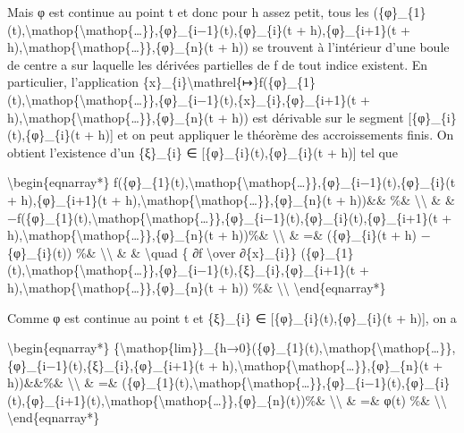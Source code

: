 \documentclass[]{article}
\begin{document}
Mais φ est continue au point t et donc pour h assez petit, tous les
(\{φ\}\_\{1\}(t),\textbackslash{}mathop\{\textbackslash{}mathop\{\ldots{}\}\},\{φ\}\_\{i−1\}(t),\{φ\}\_\{i\}(t
+ h),\{φ\}\_\{i+1\}(t +
h),\textbackslash{}mathop\{\textbackslash{}mathop\{\ldots{}\}\},\{φ\}\_\{n\}(t
+ h)) se trouvent à l'intérieur d'une boule de centre a sur laquelle les
dérivées partielles de f de tout indice existent. En particulier,
l'application
\{x\}\_\{i\}\textbackslash{}mathrel\{↦\}f(\{φ\}\_\{1\}(t),\textbackslash{}mathop\{\textbackslash{}mathop\{\ldots{}\}\},\{φ\}\_\{i−1\}(t),\{x\}\_\{i\},\{φ\}\_\{i+1\}(t
+
h),\textbackslash{}mathop\{\textbackslash{}mathop\{\ldots{}\}\},\{φ\}\_\{n\}(t
+ h)) est dérivable sur le segment {[}\{φ\}\_\{i\}(t),\{φ\}\_\{i\}(t +
h){]} et on peut appliquer le théorème des accroissements finis. On
obtient l'existence d'un \{ξ\}\_\{i\} ∈
{[}\{φ\}\_\{i\}(t),\{φ\}\_\{i\}(t + h){]} tel que

\textbackslash{}begin\{eqnarray*\}
f(\{φ\}\_\{1\}(t),\textbackslash{}mathop\{\textbackslash{}mathop\{\ldots{}\}\},\{φ\}\_\{i−1\}(t),\{φ\}\_\{i\}(t
+ h),\{φ\}\_\{i+1\}(t +
h),\textbackslash{}mathop\{\textbackslash{}mathop\{\ldots{}\}\},\{φ\}\_\{n\}(t
+ h))\&\& \%\& \textbackslash{}\textbackslash{} \& \&
−f(\{φ\}\_\{1\}(t),\textbackslash{}mathop\{\textbackslash{}mathop\{\ldots{}\}\},\{φ\}\_\{i−1\}(t),\{φ\}\_\{i\}(t),\{φ\}\_\{i+1\}(t
+
h),\textbackslash{}mathop\{\textbackslash{}mathop\{\ldots{}\}\},\{φ\}\_\{n\}(t
+ h))\%\& \textbackslash{}\textbackslash{} \& =\& (\{φ\}\_\{i\}(t + h) −
\{φ\}\_\{i\}(t)) \%\& \textbackslash{}\textbackslash{} \& \&
\textbackslash{}quad \{ ∂f \textbackslash{}over ∂\{x\}\_\{i\}\}
(\{φ\}\_\{1\}(t),\textbackslash{}mathop\{\textbackslash{}mathop\{\ldots{}\}\},\{φ\}\_\{i−1\}(t),\{ξ\}\_\{i\},\{φ\}\_\{i+1\}(t
+
h),\textbackslash{}mathop\{\textbackslash{}mathop\{\ldots{}\}\},\{φ\}\_\{n\}(t
+ h)) \%\& \textbackslash{}\textbackslash{}
\textbackslash{}end\{eqnarray*\}

Comme φ est continue au point t et \{ξ\}\_\{i\} ∈
{[}\{φ\}\_\{i\}(t),\{φ\}\_\{i\}(t + h){]}, on a

\textbackslash{}begin\{eqnarray*\}
\{\textbackslash{}mathop\{lim\}\}\_\{h→0\}(\{φ\}\_\{1\}(t),\textbackslash{}mathop\{\textbackslash{}mathop\{\ldots{}\}\},\{φ\}\_\{i−1\}(t),\{ξ\}\_\{i\},\{φ\}\_\{i+1\}(t
+
h),\textbackslash{}mathop\{\textbackslash{}mathop\{\ldots{}\}\},\{φ\}\_\{n\}(t
+ h))\&\&\%\& \textbackslash{}\textbackslash{} \& =\&
(\{φ\}\_\{1\}(t),\textbackslash{}mathop\{\textbackslash{}mathop\{\ldots{}\}\},\{φ\}\_\{i−1\}(t),\{φ\}\_\{i\}(t),\{φ\}\_\{i+1\}(t),\textbackslash{}mathop\{\textbackslash{}mathop\{\ldots{}\}\},\{φ\}\_\{n\}(t))\%\&
\textbackslash{}\textbackslash{} \& =\& φ(t) \%\&
\textbackslash{}\textbackslash{} \textbackslash{}end\{eqnarray*\}
\end{document}

